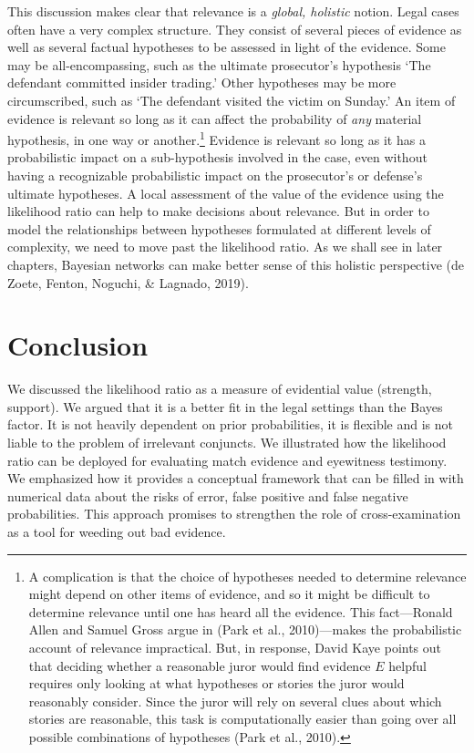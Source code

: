 \documentclass[
  10pt,
  dvipsnames,enabledeprecatedfontcommands]{scrartcl}
\begin{document}
This discussion makes clear that relevance is a
\textit{global, holistic} notion. Legal cases often have a very complex
structure. They consist of several pieces of evidence as well as several
factual hypotheses to be assessed in light of the evidence. Some may be
all-encompassing, such as the ultimate prosecutor's hypothesis `The
defendant committed insider trading.' Other hypotheses may be more
circumscribed, such as `The defendant visited the victim on Sunday.' An
item of evidence is relevant so long as it can affect the probability of
\textit{any} material hypothesis, in one way or another.\footnote{A
  complication is that the choice of hypotheses needed to determine
  relevance might depend on other items of evidence, and so it might be
  difficult to determine relevance until one has heard all the evidence.
  This fact---Ronald Allen and Samuel Gross argue in (Park et al.,
  2010)---makes the probabilistic account of relevance impractical. But,
  in response, David Kaye points out that deciding whether a reasonable
  juror would find evidence \(E\) helpful requires only looking at what
  hypotheses or stories the juror would reasonably consider. Since the
  juror will rely on several clues about which stories are reasonable,
  this task is computationally easier than going over all possible
  combinations of hypotheses (Park et al., 2010).} Evidence is relevant
so long as it has a probabilistic impact on a sub-hypothesis involved in
the case, even without having a recognizable probabilistic impact on the
prosecutor's or defense's ultimate hypotheses. A local assessment of the
value of the evidence using the likelihood ratio can help to make
decisions about relevance. But in order to model the relationships
between hypotheses formulated at different levels of complexity, we need
to move past the likelihood ratio. As we shall see in later chapters,
Bayesian networks can make better sense of this holistic perspective (de
Zoete, Fenton, Noguchi, \& Lagnado, 2019).

\hypertarget{conclusion}{%
\section{Conclusion}\label{conclusion}}

We discussed the likelihood ratio as a measure of evidential value
(strength, support). We argued that it is a better fit in the legal
settings than the Bayes factor. It is not heavily dependent on prior
probabilities, it is flexible and is not liable to the problem of
irrelevant conjuncts. We illustrated how the likelihood ratio can be
deployed for evaluating match evidence and eyewitness testimony. We
emphasized how it provides a conceptual framework that can be filled in
with numerical data about the risks of error, false positive and false
negative probabilities. This approach promises to strengthen the role of
cross-examination as a tool for weeding out bad evidence.
\end{document}
